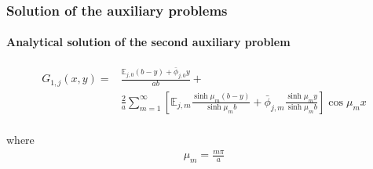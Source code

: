 \documentclass[aspectratio=169]{beamer}
\begin{document}
\begin{frame}
	\frametitle{Solution of the auxiliary problems}
	\framesubtitle{Analytical solution of the second auxiliary problem}
	
	\begin{alertblock}{}
	\begin{align*}	
		G_{1, j}(x, y) = & \frac{\mathbb{E}_{j,0}(b - y) + \bar{\phi}_{j,0}y}{ab} + \nonumber \\
		&\frac{2}{a}\sum_{m=1}^\infty\left[\mathbb{E}_{j,m}\frac{\sinh\mu_m (b - y)}{\sinh\mu_m b} + \bar{\phi}_{j, m}\frac{\sinh\mu_m y}{\sinh\mu_m b}\right]\cos\mu_m x \\
		\end{align*}
	\end{alertblock}	
	
	where
	\begin{align*}
	\mu_m = \frac{m \pi}{a}
	\end{align*}
	
\end{frame}
%
\end{document}
